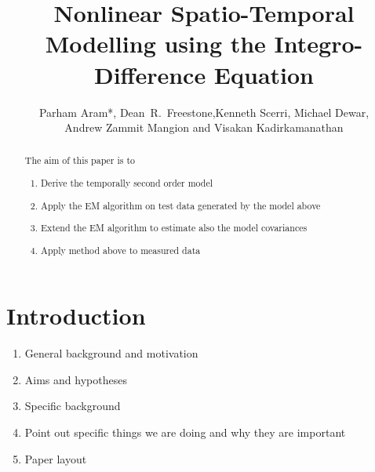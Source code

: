 \documentclass[a4paper,10pt]{article}
\title{Nonlinear Spatio-Temporal Modelling using the Integro-Difference Equation}
\author{Parham Aram*,
        Dean~R.~Freestone,Kenneth Scerri, Michael Dewar,\\ Andrew Zammit Mangion and Visakan Kadirkamanathan}
\begin{document}
\maketitle

\begin{abstract}
The aim of this paper is to 	
\begin{enumerate}
	\item Derive the temporally second order model
	\item Apply the EM algorithm on test data generated by the model above
	\item Extend the EM algorithm to estimate also the model covariances
	\item Apply method above to measured data
\end{enumerate}


\end{abstract}

\section{Introduction}
\begin{enumerate}
	\item General background and motivation
	\item Aims and hypotheses
	\item Specific background
	\item Point out specific things we are doing and why they are important
	\item Paper layout
\end{enumerate}
\end{document}
